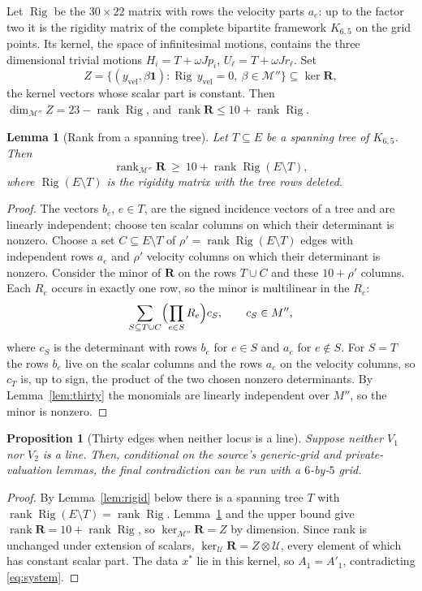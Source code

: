 \documentclass[11pt]{article}
\newtheorem{lemma}{Lemma}
\newtheorem{proposition}{Proposition}
\theoremstyle{remark}
\begin{document}
Let $\operatorname{Rig}$ be the $30\times22$ matrix with rows the
velocity parts $a_e$: up to the factor two it is the rigidity matrix
of the complete bipartite framework $K_{6,5}$ on the grid points. Its
kernel, the space of infinitesimal motions, contains the three
dimensional trivial motions $H_i=T+\omega Jp_i$,
$U_\ell=T+\omega Jr_\ell$. Set
\[
 Z=\{(y_{\mathrm{vel}},\beta\mathbf 1):
   \operatorname{Rig}\,y_{\mathrm{vel}}=0,\ \beta\in\mathcal M''\}
 \subseteq\ker\mathbf R ,
\]
the kernel vectors whose scalar part is constant. Then
$\dim_{\mathcal M''}Z=23-\operatorname{rank}\operatorname{Rig}$, and
$\operatorname{rank}\mathbf R\le10+\operatorname{rank}\operatorname{Rig}$.

\begin{lemma}[Rank from a spanning tree]
\label{lem:tree}
Let $T\subseteq E$ be a spanning tree of $K_{6,5}$. Then
\[
 \operatorname{rank}_{\mathcal M''}\mathbf R
 \ \ge\ 10+\operatorname{rank}\operatorname{Rig}(E\setminus T),
\]
where $\operatorname{Rig}(E\setminus T)$ is the rigidity matrix with
the tree rows deleted.
\end{lemma}
\begin{proof}
The vectors $b_e$, $e\in T$, are the signed incidence vectors of a
tree and are linearly independent; choose ten scalar columns on which
their determinant is nonzero. Choose a set $C\subseteq E\setminus T$
of $\rho'=\operatorname{rank}\operatorname{Rig}(E\setminus T)$ edges
with independent rows $a_e$ and $\rho'$ velocity columns on which
their determinant is nonzero. Consider the minor of $\mathbf R$ on
the rows $T\cup C$ and these $10+\rho'$ columns. Each $R_e$ occurs in
exactly one row, so the minor is multilinear in the $R_e$:
\[
 \sum_{S\subseteq T\cup C}\Bigl(\prod_{e\in S}R_e\Bigr)c_S,
 \qquad c_S\in M'' ,
\]
where $c_S$ is the determinant with rows $b_e$ for $e\in S$ and
$a_e$ for $e\notin S$. For $S=T$ the rows $b_e$ live on the scalar
columns and the rows $a_e$ on the velocity columns, so $c_T$ is, up
to sign, the product of the two chosen nonzero determinants. By
Lemma~\ref{lem:thirty} the monomials are linearly independent over
$M''$, so the minor is nonzero.
\end{proof}

\begin{proposition}[Thirty edges when neither locus is a line]
\label{prop:joint}
Suppose neither $V_1$ nor $V_2$ is a line. Then, conditional on the
source's generic-grid and private-valuation lemmas, the final
contradiction can be run with a $6$-by-$5$ grid.
\end{proposition}
\begin{proof}
By Lemma~\ref{lem:rigid} below there is a spanning tree $T$ with
$\operatorname{rank}\operatorname{Rig}(E\setminus T)
=\operatorname{rank}\operatorname{Rig}$. Lemma~\ref{lem:tree} and the
upper bound give
$\operatorname{rank}\mathbf R=10+\operatorname{rank}\operatorname{Rig}$,
so $\ker_{\mathcal M''}\mathbf R=Z$ by dimension. Since rank is
unchanged under extension of scalars,
$\ker_{\mathcal U}\mathbf R=Z\otimes\mathcal U$, every element of
which has constant scalar part. The data $x^*$ lie in this kernel, so
$A_1=A'_1$, contradicting \eqref{eq:system}.
\end{proof}
\end{document}

